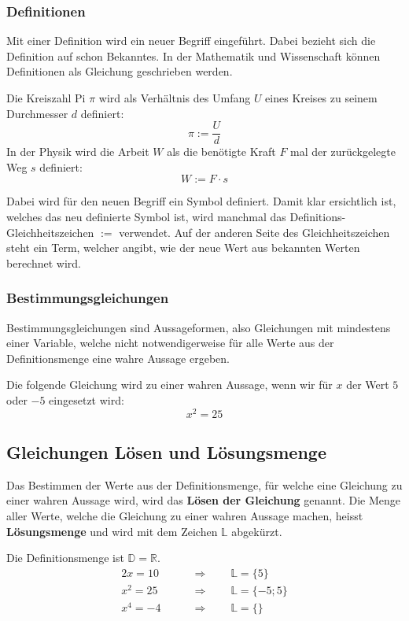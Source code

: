 \subsubsection{Definitionen}

Mit einer Definition wird ein neuer Begriff eingeführt. Dabei bezieht sich die Definition auf schon Bekanntes. In der Mathematik und Wissenschaft können Definitionen als Gleichung geschrieben werden.
\begin{example}
  Die Kreiszahl Pi $\pi$ wird als Verhältnis des Umfang $U$ eines Kreises zu seinem Durchmesser $d$ definiert:
  \[
    \pi := \frac{U}{d}
  \]
  In der Physik wird die Arbeit $W$ als die benötigte Kraft $F$ mal der zurückgelegte Weg $s$ definiert:
  \[
    W := F\cdot s
  \]
\end{example}
Dabei wird für den neuen Begriff ein Symbol definiert. Damit klar ersichtlich ist, welches das neu definierte Symbol ist, wird manchmal das Definitions-Gleichheitszeichen $:=$ verwendet. Auf der anderen Seite des Gleichheitszeichen steht ein Term, welcher angibt, wie der neue Wert aus bekannten Werten berechnet wird.

\newpage
\subsubsection{Bestimmungsgleichungen}

Bestimmungsgleichungen sind Aussageformen, also Gleichungen mit mindestens einer Variable, welche nicht notwendigerweise für alle Werte aus der Definitionsmenge eine wahre Aussage ergeben.
\begin{example}
  Die folgende Gleichung wird zu einer wahren Aussage, wenn wir für $x$ der Wert $5$ oder $-5$ eingesetzt wird:
  \[
    x^2 = 25
  \]
\end{example}

\subsection{Gleichungen Lösen und Lösungsmenge}

Das Bestimmen der Werte aus der Definitionsmenge, für welche eine Gleichung zu einer wahren Aussage wird, wird das \textbf{Lösen der Gleichung} genannt. Die Menge aller Werte, welche die Gleichung zu einer wahren Aussage machen, heisst \textbf{Lösungsmenge} und wird mit dem Zeichen $\mathbb{L}$ abgekürzt.

\begin{example}
  Die Definitionsmenge ist $\mathbb{D} = \mathbb{R}$.
  \begin{align*}
     2x = 10 \qquad&\Rightarrow\qquad \mathbb{L} = \{5\} \\
    x^2 = 25 \qquad&\Rightarrow\qquad \mathbb{L} = \{-5; 5\} \\
    x^4 = -4 \qquad&\Rightarrow\qquad \mathbb{L} = \{\}
  \end{align*}
\end{example}

